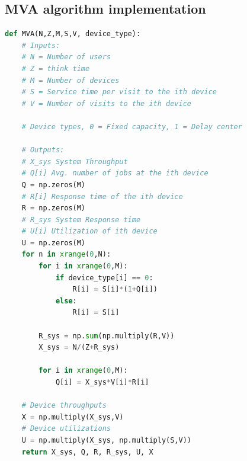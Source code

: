 \documentclass[11pt,a4paper]{article}
\begin{document}
\subsection{MVA algorithm implementation}
\begin{lstlisting}[language=Python]
def MVA(N,Z,M,S,V, device_type):
    # Inputs:
    # N = Number of users
    # Z = think time
    # M = Number of devices
    # S = Service time per visit to the ith device
    # V = Number of visits to the ith device

    # Device types, 0 = Fixed capacity, 1 = Delay center

    # Outputs:
    # X_sys System Throughput
    # Q[i] Avg. number of jobs at the ith device
    Q = np.zeros(M)
    # R[i] Response time of the ith device
    R = np.zeros(M)
    # R_sys System Response time
    # U[i] Utilization of ith device 
    U = np.zeros(M)
    for n in xrange(0,N):
        for i in xrange(0,M):
            if device_type[i] == 0:
                R[i] = S[i]*(1+Q[i])
            else:
                R[i] = S[i]

        R_sys = np.sum(np.multiply(R,V))
        X_sys = N/(Z+R_sys)

        for i in xrange(0,M):
            Q[i] = X_sys*V[i]*R[i]

    # Device throughputs
    X = np.multiply(X_sys,V)
    # Device utilizations
    U = np.multiply(X_sys, np.multiply(S,V))
    return X_sys, Q, R, R_sys, U, X


\end{lstlisting}
\end{document}
